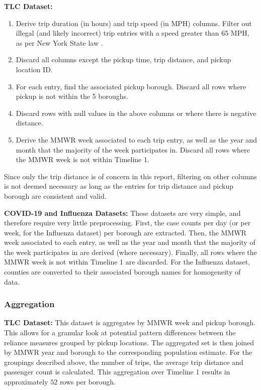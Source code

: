 \documentclass[11pt]{article}
\begin{document}
\textbf{TLC Dataset:}
    \begin{enumerate}
        \item Derive trip duration (in hours) and trip speed (in MPH) columns. 
        Filter out illegal (and likely incorrect) trip entries with a speed greater than 65 MPH, 
        as per New York State law \cite{laws}.
        \item Discard all columns except the pickup time, trip distance, and pickup location ID.
        \item For each entry, find the associated pickup borough. 
        Discard all rows where pickup is not within the 5 boroughs.
        \item Discard rows with null values in the above columns or where there is negative distance.
        \item Derive the MMWR week associated to each trip entry, as well as the year and month that the majority of the week participates in.
        Discard all rows where the MMWR week is not within Timeline 1.
    \end{enumerate}
Since only the trip distance is of concern in this report,
filtering on other columns is not deemed necessary as long as the entries for trip distance and pickup borough are consistent and valid.

\textbf{COVID-19 and Influenza Datasets:}
These datasets are very simple, and therefore require very little preprocessing.
First, the case counts per day (or per week, for the Influenza dataset) per borough are extracted. 
Then, the MMWR week associated to each entry, as well as the year and month that the majority of the week participates in are derived (where necessary).
Finally, all rows where the MMWR week is not within Timeline 1 are discarded.
For the Influenza dataset, 
counties are converted to their associated borough names for homogeneity of data.

\subsubsection{Aggregation}

\textbf{TLC Dataset:}
This dataset is aggregates by MMWR week and pickup borough.
This allows for a granular look at potential pattern differences between the reliance measures grouped by pickup locations.
The aggregated set is then joined by MMWR year and borough to the corresponding population estimate.
For the groupings described above, the number of trips,
the average trip distance and passenger count is calculated.
This aggregation over Timeline 1 results in approximately $52$ rows per borough.
\end{document}
